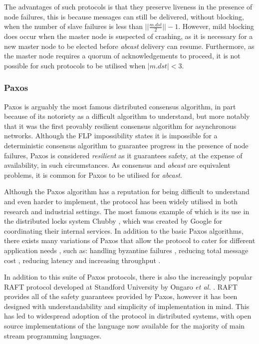 	The advantages of such protocols is that they preserve liveness in the presence of node failures, this is because messages can still be delivered, without blocking, when the number of slave failures is less than $\vert\vert \frac{m.dst}{2} \vert\vert - 1$.  However, mild blocking does occur when the master node is suspected of crashing, as it is necessary for a new master node to be elected before \emph{abcast} delivery can resume. Furthermore, as the master node requires a quorum of acknowledgements to proceed, it is not possible for such protocols to be utilised when $\left\vert m.dst \right\vert < 3$. 
		
		\subsubsection*{Paxos}
		Paxos\citep{Lamport:1998:PP:279227.279229}\citep{Lamport:2001:PaxosMadeSimple} is arguably the most famous distributed consensus algorithm, in part because of its notoriety as a difficult algorithm to understand, but more notably that it was the first provably resilient consensus algorithm for asynchronous networks.  Although the FLP \citep{Fischer:1985:IDC:3149.214121} impossibility states it is impossible for a deterministic consensus algorithm to guarantee progress in the presence of node failures, Paxos is considered \emph{resilient} as it guarantees safety, at the expense of availability, in such circumstances.  As consensus and \emph{abcast} are equivalent problems\citep{Defago:2004:TOB:1041680.1041682}, it is common for Paxos to be utilised for \emph{abcast}.  
		
		Although the Paxos algorithm has a reputation for being difficult to understand and even harder to implement, the protocol has been widely utilised in both research and industrial settings.  The most famous example of which is its use in the distributed locks system Chubby \citep{Burrows:2006:CLS:1298455.1298487}, which was created by Google for coordinating their internal services.  In addition to the basic Paxos algorithms, there exists many variations of Paxos that allow the protocol to cater for different application needs \citep{DBLP:journals/corr/MarandiBPB14}, such as: handling byzantine failures \citep{DBLP:conf/wdag/Lamport11a}, reducing total message cost \citep{DBLP:conf/dsn/LamportM04}, reducing latency \citep{DBLP:journals/dc/Lamport06} and increasing throughput \citep{marandi2010ring, Santos:2012:TPH:2183677.2183688}.  
		
		In addition to this suite of Paxos protocols, there is also the increasingly popular RAFT protocol developed at Standford University by Ongaro \emph{et al.} \citep{Ongaro:2014:SUC:2643634.2643666}.  RAFT provides all of the safety guarantees provided by Paxos, however it has been designed with understandability and simplicity of implementation in mind.  This has led to widespread adoption of the protocol in distributed systems, with open source implementations of the language now available for the majority of main stream programming languages.  
		
